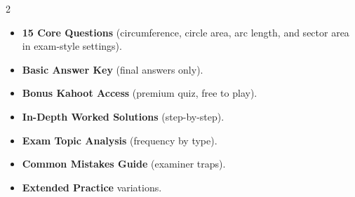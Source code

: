 \documentclass[11pt,a4paper]{article}
\newcommand{\FullReleaseDate}{April 30, 2026}
\begin{document}
\vspace{8pt}

\begin{multicols}{2}
  \begin{tcolorbox}[card, title=\sffamily\bfseries\textcolor{white}{\faHandPointDown\ TODAY (Simplified Version)}, colbacktitle=mainblue, boxed title style={sharp corners, boxrule=0pt}]
    \begin{itemize}[leftmargin=1.2em, itemsep=2pt]
      \item \small \textbf{15 Core Questions} (circumference, circle area, arc length, and sector area in exam-style settings).
      \item \small \textbf{Basic Answer Key} (final answers only).
      \item \small \textbf{Bonus Kahoot Access} (premium quiz, free to play).
    \end{itemize}
  \end{tcolorbox}

  \columnbreak

  \begin{tcolorbox}[card, title=\sffamily\bfseries\textcolor{white}{\faRocket\ ON \FullReleaseDate\ (Full Upgrade)}, colbacktitle=mainblue, boxed title style={sharp corners, boxrule=0pt}]
    \begin{itemize}[leftmargin=1.2em, itemsep=2pt]
      \item \small \textbf{In-Depth Worked Solutions} (step-by-step).
      \item \small \textbf{Exam Topic Analysis} (frequency by type).
      \item \small \textbf{Common Mistakes Guide} (examiner traps).
      \item \small \textbf{Extended Practice} variations.
    \end{itemize}
  \end{tcolorbox}
\end{multicols}
\end{document}
